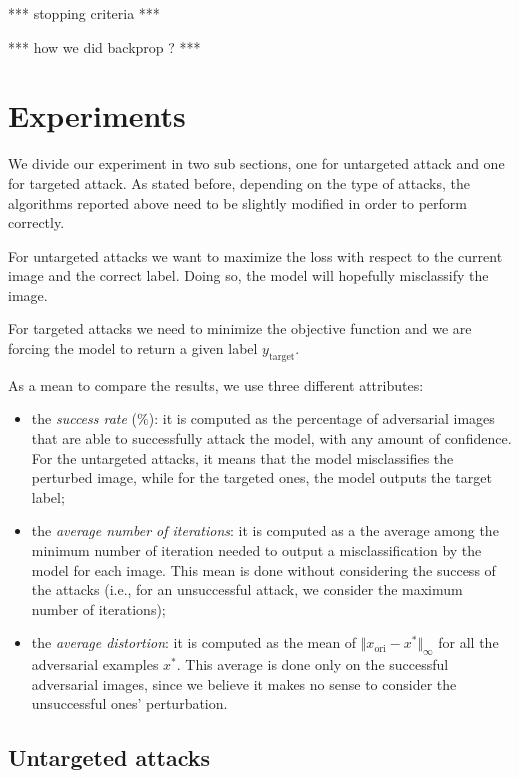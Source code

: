 \documentclass[10pt,twocolumn,letterpaper, english]{article}
\theoremstyle{definition}
\theoremstyle{plain}
\theoremstyle{plain}
\theoremstyle{plain}
\theoremstyle{plain}
\theoremstyle{remark}
\theoremstyle{remark}
\theoremstyle{definition}
\theoremstyle{definition}
\theoremstyle{definition}
\theoremstyle{definition}
\begin{document}
*** stopping criteria *** 

*** how we did backprop ? *** 


\section{Experiments}
We divide our experiment in two sub sections, one for untargeted attack and one for targeted attack. As stated before, depending on the type of attacks, the algorithms reported above need to be slightly modified in order to perform correctly.

For untargeted attacks we want to maximize the loss with respect to the current image and the correct label. Doing so, the model will hopefully misclassify the image.

For targeted attacks we need to minimize the objective function and we are forcing the model to return a given label $y_{\text{target}}$.

As a mean to compare the results, we use three different attributes: 
\begin{itemize}
    \item the \textit{success rate} ($\%$): it is computed as the percentage of adversarial images that are able to successfully attack the model, with any amount of confidence. For the untargeted attacks, it means that the model misclassifies the perturbed image, while for the targeted ones, the model outputs the target label;
    
    \item the \textit{average number of iterations}: it is computed as a the average among the minimum number of iteration needed to output a misclassification by the model for each image. This mean is done without considering the success of the attacks (i.e., for an unsuccessful attack, we consider the maximum number of iterations); 
    
    \item the \textit{average distortion}: it is computed as the mean of $\Vert x_{\text{ori}} - x^\ast \Vert_{\infty}$ for all the adversarial examples $x^*$. This average is done only on the successful adversarial images, since we believe it makes no sense to consider the unsuccessful ones' perturbation. 
\end{itemize}

\subsection{Untargeted attacks}
\end{document}
